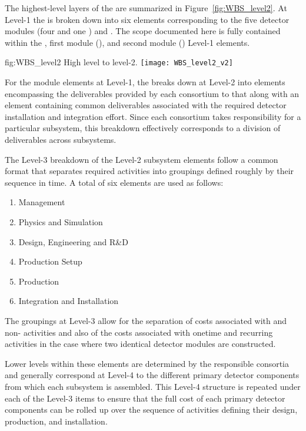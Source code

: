 The highest-level layers of the   are summarized 
in Figure~\ref{fig:WBS_level2}.  At Level-1 the  is broken down into 
six elements corresponding to the five  detector modules (four 
 and one ) and .  The scope documented
here is fully contained within the , first  module 
(), and second  module () Level-1 elements.   
\begin{dunefigure}{fig:WBS_level2}
  {High level   to level-2.}
  \texttt{[image: WBS\_level2\_v2]}
\end{dunefigure}

For the  module elements at Level-1, the  breaks 
down at Level-2 into elements encompassing the deliverables provided by 
each consortium to that  along with an element containing 
common deliverables associated with the required detector installation 
and integration effort.  Since each consortium takes responsibility 
for a particular subsystem, this breakdown effectively corresponds to 
a division of deliverables across subsystems. 

The Level-3 breakdown of the Level-2 subsystem  elements follow 
a common format that separates required activities into groupings defined 
roughly by their sequence in time.  A total of six elements are used as 
follows:     
\begin{enumerate}
  \item Management
  \item Physics and Simulation
  \item Design, Engineering and R\&D
  \item Production Setup
  \item Production
  \item Integration and Installation
\end{enumerate}
The groupings at Level-3 allow for the separation of costs associated
with  and non- activities and also of the
costs associated with onetime and recurring activities in the case
where two identical detector modules are constructed.

Lower levels within these  elements are determined by 
the responsible consortia and generally correspond at Level-4 to 
the different primary detector components from which each subsystem
is assembled.  This Level-4 structure is repeated under each of the 
Level-3 items to ensure that the full cost of each primary detector 
components can be rolled up over the sequence of activities defining 
their design, production, and installation.       

